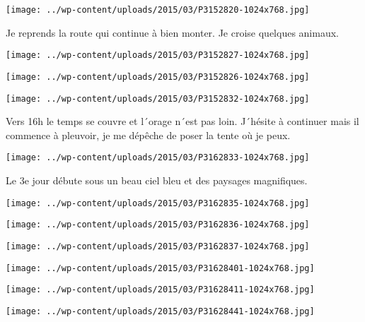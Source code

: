 \centerline{\texttt{[image: ../wp-content/uploads/2015/03/P3152820-1024x768.jpg]} } 
 \newline
 Je reprends la route qui continue à bien monter. Je croise quelques animaux. \newline
 \newline
\centerline{\texttt{[image: ../wp-content/uploads/2015/03/P3152827-1024x768.jpg]} } 
 \newline
 \newline
\centerline{\texttt{[image: ../wp-content/uploads/2015/03/P3152826-1024x768.jpg]} } 
 \newline
 \newline
\centerline{\texttt{[image: ../wp-content/uploads/2015/03/P3152832-1024x768.jpg]} } 
 \newline
 Vers 16h le temps se couvre et l´orage n´est pas loin. J´hésite à continuer mais il commence à pleuvoir, je me dépêche de poser la tente où je peux. \newline
 \newline
\centerline{\texttt{[image: ../wp-content/uploads/2015/03/P3162833-1024x768.jpg]} } 
 \newline
 Le 3e jour débute sous un beau ciel bleu et des paysages magnifiques. \newline
 \newline
\centerline{\texttt{[image: ../wp-content/uploads/2015/03/P3162835-1024x768.jpg]} } 
 \newline
 \newline
\centerline{\texttt{[image: ../wp-content/uploads/2015/03/P3162836-1024x768.jpg]} } 
 \newline
 \newline
\centerline{\texttt{[image: ../wp-content/uploads/2015/03/P3162837-1024x768.jpg]} } 
 \newline
 \newline
\centerline{\texttt{[image: ../wp-content/uploads/2015/03/P31628401-1024x768.jpg]} } 
 \newline
 \newline
\centerline{\texttt{[image: ../wp-content/uploads/2015/03/P31628411-1024x768.jpg]} } 
 \newline
 \newline
\centerline{\texttt{[image: ../wp-content/uploads/2015/03/P31628441-1024x768.jpg]} } 
 \newline
 \newline
